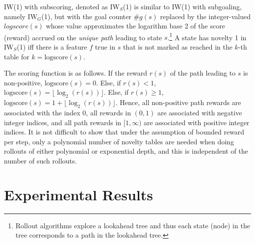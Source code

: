 \documentclass[letterpaper]{article}
\newcommand{\CHECK}[1]{\textcolor{red}{\bf *** #1 ***}}
\begin{document}
IW(1) with subscoring, denoted as $\textrm{IW}_S$(1) is similar to IW(1) with subgoaling,
namely $\textrm{IW}_G$(1), but with the goal counter $\#g(s)$ replaced by the integer-valued
$logscore(s)$ whose value approximates the logarithm base 2 of the score (reward) accrued
on the \emph{unique path} leading to state $s$.\footnote{Rollout algorithms explore a
  lookahead tree and thus each state (node) in the tree corresponds to a path
  in the lookahead tree.
}
A state has novelty 1 in $\textrm{IW}_S$(1) iff there is a feature $f$ true in $s$ that
is not marked as reached in the $k$-th table for $k=\text{logscore}(s)$.

The scoring function is as follows. If the reward $r(s)$ of the path leading
to $s$ is non-positive, $\text{logscore}(s)=0$.
Else, if $r(s)<1$, $\text{logscore}(s)=\lfloor\log_2(r(s))\rfloor$.
Else, if $r(s)\geq 1$, $\text{logscore}(s)=1 + \lfloor\log_2(r(s))\rfloor$.
Hence, all non-positive path rewards are associated with the index 0, all
rewards in $(0,1)$ are associated with negative integer indices, and all
path rewards in $[1,\infty)$ are associated with positive integer indices.
It is not difficult to show that under the assumption of bounded reward per
step, only a polynomial number of novelty tables are needed when doing rollouts
of either polynomial or exponential depth, and this is independent of the number
of such rollouts.


\section{Experimental Results}
\end{document}
